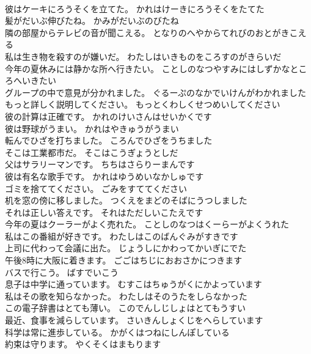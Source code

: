 \documentclass[8pt]{extreport}
\begin{document}
\begin{CJK}{UTF8}{min}
\\	彼はケーキにろうそくを立てた。	かれはけーきにろうそくをたてた 
\\	髪がだいぶ伸びたね。	かみがだいぶのびたね 
\\	隣の部屋からテレビの音が聞こえる。	となりのへやからてれびのおとがきこえる 
\\	私は生き物を殺すのが嫌いだ。	わたしはいきものをころすのがきらいだ 
\\	今年の夏休みには静かな所へ行きたい。	ことしのなつやすみにはしずかなところへいきたい 
\\	グループの中で意見が分かれました。	ぐるーぷのなかでいけんがわかれました 
\\	もっと詳しく説明してください。	もっとくわしくせつめいしてください 
\\	彼の計算は正確です。	かれのけいさんはせいかくです 
\\	彼は野球がうまい。	かれはやきゅうがうまい 
\\	転んでひざを打ちました。	ころんでひざをうちました 
\\	そこは工業都市だ。	そこはこうぎょうとしだ 
\\	父はサラリーマンです。	ちちはさらりーまんです 
\\	彼は有名な歌手です。	かれはゆうめいなかしゅです 
\\	ゴミを捨ててください。	ごみをすててください 
\\	机を窓の傍に移しました。	つくえをまどのそばにうつしました 
\\	それは正しい答えです。	それはただしいこたえです 
\\	今年の夏はクーラーがよく売れた。	ことしのなつはくーらーがよくうれた 
\\	私はこの番組が好きです。	わたしはこのばんぐみがすきです 
\\	上司に代わって会議に出た。	じょうしにかわってかいぎにでた 
\\	午後8時に大阪に着きます。	ごごはちじにおおさかにつきます 
\\	バスで行こう。	ばすでいこう 
\\	息子は中学に通っています。	むすこはちゅうがくにかよっています 
\\	私はその歌を知らなかった。	わたしはそのうたをしらなかった 
\\	この電子辞書はとても薄い。	このでんしじしょはとてもうすい 
\\	最近、食事を減らしています。	さいきんしょくじをへらしています 
\\	科学は常に進歩している。	かがくはつねにしんぽしている 
\\	約束は守ります。	やくそくはまもります 

\end{CJK}
\end{document}
